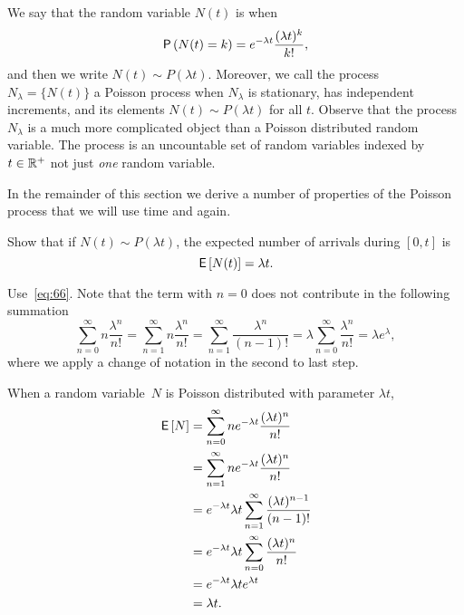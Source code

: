 We say that the random variable $N(t)$ is  when 
\begin{equation}\label{eq:pois}
  \P{N(t) = k} = 
e^{-\lambda t} \frac{(\lambda t)^k}{k!}, 
\end{equation}
and then we write $N(t)\sim P(\lambda t)$.
Moreover, we call the process $N_\lambda=\{N(t)\}$ a Poisson process when $N_\lambda$ is stationary, has independent increments, and its elements $N(t)\sim P(\lambda t)$ for all $t$.
Observe that the process $N_\lambda$  is a much more complicated object than a Poisson distributed random variable.
The process is an uncountable set of random variables indexed by $t\in \mathbb{R}^+$ not just \emph{one} random variable.


In the remainder of this section we derive a number of  properties of the Poisson process that we will use time and again.

\begin{exercise}{\faCalculator}\label{ex:2}
  Show that if $N(t)\sim P(\lambda t)$, the expected number of arrivals during $[0,t]$ is
  \begin{equation*}
  \,\mathsf{E}\left[N(t)\right] = \lambda t.
  \end{equation*}
  \begin{hint}
Use~\eqref{eq:66}. Note  that the term with $n=0$ does not contribute in the following summation
\begin{equation*}
\sum_{n=0}^\infty n \frac{\lambda^n}{n!} = \sum_{n=1}^\infty n \frac{\lambda^n}{n!} = \sum_{n=1}^\infty \frac{\lambda^n}{(n-1)!} = \lambda \sum_{n=0}^\infty \frac{\lambda^n}{n!} = \lambda e^{\lambda},
\end{equation*}
where we apply a change of notation in the second to last step.
  \end{hint}
  \begin{solution} 
    When a random variable~$N$ is Poisson distributed with parameter
    $\lambda t$,
    \begin{align*}
      \,\mathsf{E}\left[N\right] 
&= \sum_{n=0}^\infty n e^{-\lambda t}\frac{(\lambda t)^n}{n!}  \\
&= \sum_{n=1}^\infty n e^{-\lambda t}\frac{(\lambda t)^n}{n!} \\ 
&= e^{-\lambda t} \lambda t \sum_{n=1}^\infty \frac{(\lambda t)^{n-1}}{(n-1)!} \\
&= e^{-\lambda t} \lambda t \sum_{n=0}^\infty \frac{(\lambda t)^{n}}{n!} \\
&= e^{-\lambda t} \lambda t e^{\lambda t} \\
&= \lambda t.
    \end{align*}
\end{solution}
\end{exercise}


